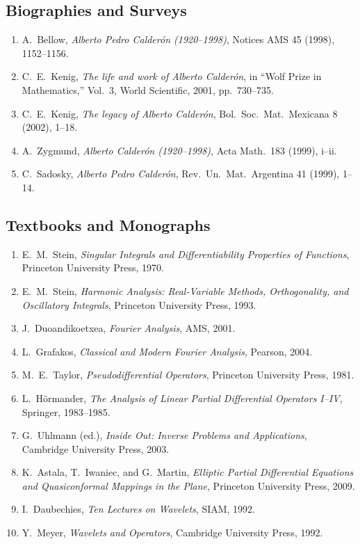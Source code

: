 \subsection*{Biographies and Surveys}
\begin{enumerate}
    \item A.\ Bellow, \textit{Alberto Pedro Calder\'{o}n (1920--1998)}, Notices AMS 45 (1998), 1152--1156.
    \item C.\ E.\ Kenig, \textit{The life and work of Alberto Calder\'{o}n}, in ``Wolf Prize in Mathematics,'' Vol.\ 3, World Scientific, 2001, pp.\ 730--735.
    \item C.\ E.\ Kenig, \textit{The legacy of Alberto Calder\'{o}n}, Bol.\ Soc.\ Mat.\ Mexicana 8 (2002), 1--18.
    \item A.\ Zygmund, \textit{Alberto Calder\'{o}n (1920--1998)}, Acta Math.\ 183 (1999), i--ii.
    \item C.\ Sadosky, \textit{Alberto Pedro Calder\'{o}n}, Rev.\ Un.\ Mat.\ Argentina 41 (1999), 1--14.
\end{enumerate}

\subsection*{Textbooks and Monographs}
\begin{enumerate}
    \item E.\ M.\ Stein, \textit{Singular Integrals and Differentiability Properties of Functions}, Princeton University Press, 1970.
    \item E.\ M.\ Stein, \textit{Harmonic Analysis: Real-Variable Methods, Orthogonality, and Oscillatory Integrals}, Princeton University Press, 1993.
    \item J.\ Duoandikoetxea, \textit{Fourier Analysis}, AMS, 2001.
    \item L.\ Grafakos, \textit{Classical and Modern Fourier Analysis}, Pearson, 2004.
    \item M.\ E.\ Taylor, \textit{Pseudodifferential Operators}, Princeton University Press, 1981.
    \item L.\ H\"ormander, \textit{The Analysis of Linear Partial Differential Operators I--IV}, Springer, 1983--1985.
    \item G.\ Uhlmann (ed.), \textit{Inside Out: Inverse Problems and Applications}, Cambridge University Press, 2003.
    \item K.\ Astala, T.\ Iwaniec, and G.\ Martin, \textit{Elliptic Partial Differential Equations and Quasiconformal Mappings in the Plane}, Princeton University Press, 2009.
    \item I.\ Daubechies, \textit{Ten Lectures on Wavelets}, SIAM, 1992.
    \item Y.\ Meyer, \textit{Wavelets and Operators}, Cambridge University Press, 1992.
\end{enumerate}
